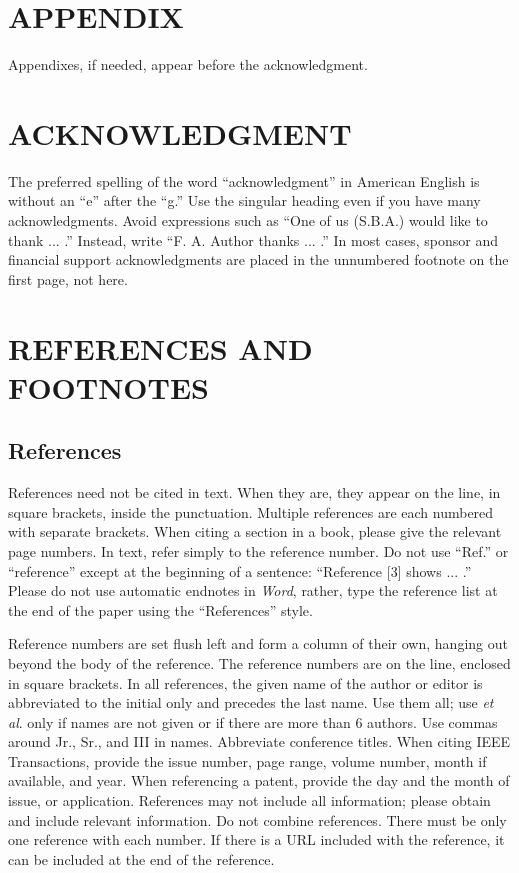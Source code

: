 \documentclass{IEEEtaes}
\begin{document}
\section*{APPENDIX}

Appendixes, if needed, appear before the acknowledgment.

\section*{ACKNOWLEDGMENT}

The preferred spelling of the word ``acknowledgment'' in American English is without an ``e'' after the ``g.'' Use the singular heading even if you have many acknowledgments. Avoid expressions such as ``One of us (S.B.A.) would like to thank ... .'' Instead, write ``F. A. Author thanks ... .'' In most cases, sponsor and financial support acknowledgments are placed in the unnumbered footnote on the first page, not here.

\section*{REFERENCES AND FOOTNOTES}

\subsection{References}

References need not be cited in text. When they are, they appear on the line, in square brackets, inside the punctuation. Multiple references are each numbered with separate brackets. When citing a section in a book, please give the relevant page numbers. In text, refer simply to the reference number. Do not use ``Ref.'' or ``reference'' except at the beginning of a sentence: ``Reference {[}3{]} shows ... .'' Please do not use automatic endnotes in \emph{Word}, rather, type the reference list at the end of the paper using the ``References'' style.

Reference numbers are set flush left and form a column of their own, hanging out beyond the body of the reference. The reference numbers are on the line, enclosed in square brackets. In all references, the given name of the author or editor is abbreviated to the initial only and precedes the last name. Use them all; use \emph{et al}. only if names are not given or if there are more than 6 authors. Use commas around Jr., Sr., and III in names. Abbreviate conference titles. When citing IEEE Transactions, provide the issue number, page range, volume number, month if available, and year. When referencing a patent, provide the day and the month of issue, or application. References may not include all information; please obtain and include relevant information. Do not combine references. There must be only one reference with each number. If there is a URL included with the reference, it can be included at the end of the reference.
\end{document}
